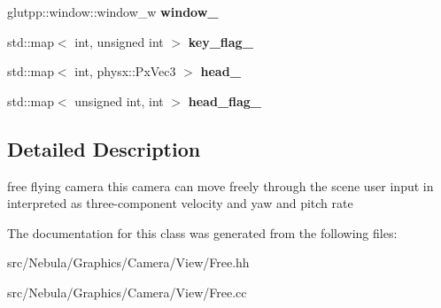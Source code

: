 \begin{DoxyCompactItemize}
\item 
\hypertarget{classglutpp_1_1Camera_1_1View_1_1Free_a94621c66a51dea55cb1f2a25b433b508}{glutpp\-::window\-::window\-\_\-w {\bfseries window\-\_\-}}\label{classglutpp_1_1Camera_1_1View_1_1Free_a94621c66a51dea55cb1f2a25b433b508}

\item 
\hypertarget{classglutpp_1_1Camera_1_1View_1_1Free_a53c1787f79a27ab556cd2ceebe00f217}{std\-::map$<$ int, unsigned int $>$ {\bfseries key\-\_\-flag\-\_\-}}\label{classglutpp_1_1Camera_1_1View_1_1Free_a53c1787f79a27ab556cd2ceebe00f217}

\item 
\hypertarget{classglutpp_1_1Camera_1_1View_1_1Free_ad757176778e811180c8591720eeef4a7}{std\-::map$<$ int, physx\-::\-Px\-Vec3 $>$ {\bfseries head\-\_\-}}\label{classglutpp_1_1Camera_1_1View_1_1Free_ad757176778e811180c8591720eeef4a7}

\item 
\hypertarget{classglutpp_1_1Camera_1_1View_1_1Free_aed05795815a16e4c315b7fe08340a511}{std\-::map$<$ unsigned int, int $>$ {\bfseries head\-\_\-flag\-\_\-}}\label{classglutpp_1_1Camera_1_1View_1_1Free_aed05795815a16e4c315b7fe08340a511}

\end{DoxyCompactItemize}


\subsection{Detailed Description}
free flying camera this camera can move freely through the scene user input in interpreted as three-\/component velocity and yaw and pitch rate 

The documentation for this class was generated from the following files\-:\begin{DoxyCompactItemize}
\item 
src/\-Nebula/\-Graphics/\-Camera/\-View/Free.\-hh\item 
src/\-Nebula/\-Graphics/\-Camera/\-View/Free.\-cc\end{DoxyCompactItemize}
